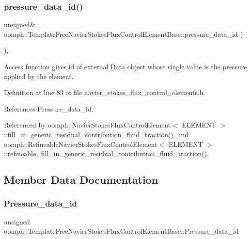 \subsubsection{\texorpdfstring{pressure\+\_\+data\+\_\+id()}{pressure\_data\_id()}}
{\footnotesize\ttfamily unsigned\& oomph\+::\+Template\+Free\+Navier\+Stokes\+Flux\+Control\+Element\+Base\+::pressure\+\_\+data\+\_\+id (\begin{DoxyParamCaption}{ }\end{DoxyParamCaption})\hspace{0.3cm}{\ttfamily [inline]}, {\ttfamily [protected]}}



Access function gives id of external \hyperlink{classoomph_1_1Data}{Data} object whose single value is the pressure applied by the element. 



Definition at line 83 of file navier\+\_\+stokes\+\_\+flux\+\_\+control\+\_\+elements.\+h.



References Pressure\+\_\+data\+\_\+id.



Referenced by oomph\+::\+Navier\+Stokes\+Flux\+Control\+Element$<$ E\+L\+E\+M\+E\+N\+T $>$\+::fill\+\_\+in\+\_\+generic\+\_\+residual\+\_\+contribution\+\_\+fluid\+\_\+traction(), and oomph\+::\+Refineable\+Navier\+Stokes\+Flux\+Control\+Element$<$ E\+L\+E\+M\+E\+N\+T $>$\+::refineable\+\_\+fill\+\_\+in\+\_\+generic\+\_\+residual\+\_\+contribution\+\_\+fluid\+\_\+traction().



\subsection{Member Data Documentation}
\mbox{\label{classoomph_1_1TemplateFreeNavierStokesFluxControlElementBase_aa2241fa9932f0e17286c2f8c02811b1a}} 
\subsubsection{\texorpdfstring{Pressure\+\_\+data\+\_\+id}{Pressure\_data\_id}}
{\footnotesize\ttfamily unsigned oomph\+::\+Template\+Free\+Navier\+Stokes\+Flux\+Control\+Element\+Base\+::\+Pressure\+\_\+data\+\_\+id\hspace{0.3cm}{\ttfamily [private]}}



